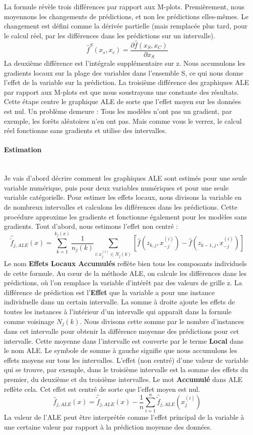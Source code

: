 La formule révèle trois différences par rapport aux M-plots. 
Premièrement, nous moyennons les changements de prédictions, et non les prédictions elles-mêmes.
Le changement est défini comme la dérivée partielle (mais remplacée plus tard, pour le calcul réel, par les différences dans les prédictions sur un intervalle).
$$\hat{f}^S(x_s,x_c)=\frac{\partial\hat{f}(x_S,x_C)}{\partial{}x_S}$$
La deuxième différence est l'intégrale supplémentaire sur z. Nous accumulons les gradients locaux sur la plage des variables dans l'ensemble S, ce qui nous donne l'effet de la variable sur la prédiction.
La troisième différence des graphiques ALE par rapport aux M-plots est que nous soustrayons une constante des résultats. Cette étape centre le graphique ALE de sorte que l'effet moyen sur les données est nul. Un problème demeure : Tous les modèles n'ont pas un gradient, par exemple, les forêts aléatoires n'en ont pas. Mais comme vous le verrez, le calcul réel fonctionne sans gradients et utilise des intervalles.

\paragraph{Estimation}
\\

Je vais d'abord décrire comment les graphiques ALE sont estimés pour une seule variable numérique, puis pour deux variables numériques et pour une seule variable catégorielle. Pour estimer les effets locaux, nous divisons la variable en de nombreux intervalles et calculons les différences dans les prédictions. Cette procédure approxime les gradients et fonctionne également pour les modèles sans gradients.
Tout d'abord, nous estimons l'effet non centré : 
$$\hat{\tilde{f}}_{j,ALE}(x)=\sum_{k=1}^{k_j(x)}\frac{1}{n_j(k)}\sum_{i:x_{j}^{(i)}\in{}N_j(k)}\left[\hat{f}(z_{k,j},x^{(i)}_{-j})-\hat{f}(z_{k-1,j},x^{(i)}_{-j})\right]$$
Le nom \textbf{Effets Locaux Accumulés} reflète bien tous les composants individuels de cette formule.
Au cœur de la méthode ALE, on calcule les différences dans les prédictions, où l'on remplace la variable d'intérêt par des valeurs de grille z.
La différence de prédiction est l'\textbf{Effet} que la variable a pour une instance individuelle dans un certain intervalle.
La somme à droite ajoute les effets de toutes les instances à l'intérieur d'un intervalle qui apparaît dans la formule comme voisinage \(N_j(k)\).
Nous divisons cette somme par le nombre d'instances dans cet intervalle pour obtenir la différence moyenne des prédictions pour cet intervalle.
Cette moyenne dans l'intervalle est couverte par le terme \textbf{Local} dans le nom ALE.
Le symbole de somme à gauche signifie que nous accumulons les effets moyens sur tous les intervalles.
L'effet (non centré) d'une valeur de variable qui se trouve, par exemple, dans le troisième intervalle est la somme des effets du premier, du deuxième et du troisième intervalles.
Le mot \textbf{Accumulé} dans ALE reflète cela.
Cet effet est centré de sorte que l'effet moyen est nul.
$$\hat{f}_{j,ALE}(x)=\hat{\tilde{f}}_{j,ALE}(x)-\frac{1}{n}\sum_{i=1}^{n}\hat{\tilde{f}}_{j,ALE}(x^{(i)}_{j})$$
La valeur de l'ALE peut être interprétée comme l'effet principal de la variable à une certaine valeur par rapport à la prédiction moyenne des données.


